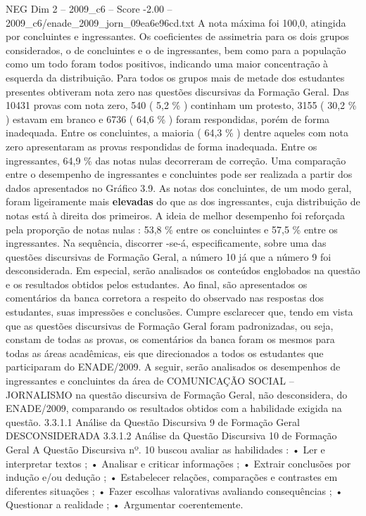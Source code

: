 \begin{textsample}{NEG Dim 2 – 2009\_c6 – Score -2.00 – 2009\_c6/enade\_2009\_jorn\_09ea6e96cd.txt}
A nota máxima foi 100,0, atingida por concluintes e ingressantes.
Os coeficientes de assimetria para os dois grupos considerados, o de concluintes e o de ingressantes, bem como para a população como um todo foram todos positivos, indicando uma maior concentração à esquerda da distribuição.
Para todos os grupos mais de metade dos estudantes presentes obtiveram nota zero nas questões discursivas da Formação Geral.
Das 10431 provas com nota zero, 540 ( 5,2 \% ) continham um protesto, 3155 ( 30,2 \% ) estavam em branco e 6736 ( 64,6 \% ) foram respondidas, porém de forma inadequada.
Entre os concluintes, a maioria ( 64,3 \% ) dentre aqueles com nota zero apresentaram as provas respondidas de forma inadequada.
Entre os ingressantes, 64,9 \% das notas nulas decorreram de correção.
Uma comparação entre o desempenho de ingressantes e concluintes pode ser realizada a partir dos dados apresentados no Gráfico 3.9.
As notas dos concluintes, de um modo geral, foram ligeiramente mais \textbf{elevadas} do que as dos ingressantes, cuja distribuição de notas está à direita dos primeiros.
A ideia de melhor desempenho foi reforçada pela proporção de notas nulas : 53,8 \% entre os concluintes e 57,5 \% entre os ingressantes.
Na sequência, discorrer -se-á, especificamente, sobre uma das questões discursivas de Formação Geral, a número 10 já que a número 9 foi desconsiderada.
Em especial, serão analisados os conteúdos englobados na questão e os resultados obtidos pelos estudantes.
Ao final, são apresentados os comentários da banca corretora a respeito do observado nas respostas dos estudantes, suas impressões e conclusões.
Cumpre esclarecer que, tendo em vista que as questões discursivas de Formação Geral foram padronizadas, ou seja, constam de todas as provas, os comentários da banca foram os mesmos para todas as áreas acadêmicas, eis que direcionados a todos os estudantes que participaram do ENADE/2009.
A seguir, serão analisados os desempenhos de ingressantes e concluintes da área de COMUNICAÇÃO SOCIAL – JORNALISMO na questão discursiva de Formação Geral, não desconsidera, do ENADE/2009, comparando os resultados obtidos com a habilidade exigida na questão. 3.3.1.1 Análise da Questão Discursiva 9 de Formação Geral DESCONSIDERADA 3.3.1.2 Análise da Questão Discursiva 10 de Formação Geral A Questão Discursiva nº. 10 buscou avaliar as habilidades : • Ler e interpretar textos ; • Analisar e criticar informações ; • Extrair conclusões por indução e/ou dedução ; • Estabelecer relações, comparações e contrastes em diferentes situações ; • Fazer escolhas valorativas avaliando consequências ; • Questionar a realidade ; • Argumentar coerentemente.

\end{textsample}
